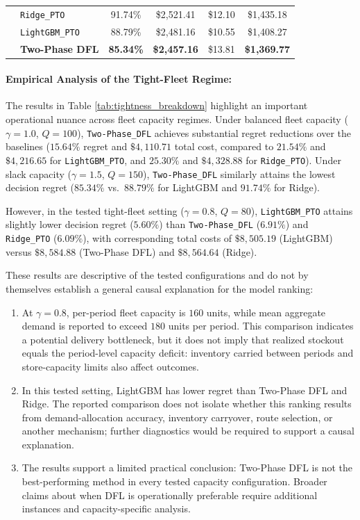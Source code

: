 \documentclass[11pt,a4paper]{article}
\theoremstyle{definition}
\theoremstyle{remark}
\begin{document}
\begin{table}[H]
\begin{tabular}{@{}llcccc@{}}
\midrule
{} 
 & \texttt{Ridge\_PTO} & 91.74\% & \$2,521.41 & \$12.10 & \$1,435.18 \\
 & \texttt{LightGBM\_PTO} & 88.79\% & \$2,481.16 & \$10.55 & \$1,408.27 \\
 & \textbf{Two-Phase DFL} & \textbf{85.34\%} & \textbf{\$2,457.16} & \$13.81 & \textbf{\$1,369.77} \\
\bottomrule
\end{tabular}
\end{table}

\paragraph{Empirical Analysis of the Tight-Fleet Regime:}
The results in Table \ref{tab:tightness_breakdown} highlight an important operational nuance across fleet capacity regimes. Under balanced fleet capacity ($\gamma = 1.0$, $Q = 100$), \texttt{Two-Phase\_DFL} achieves substantial regret reductions over the baselines ($15.64\%$ regret and $\$4,110.71$ total cost, compared to $21.54\%$ and $\$4,216.65$ for \texttt{LightGBM\_PTO}, and $25.30\%$ and $\$4,328.88$ for \texttt{Ridge\_PTO}). Under slack capacity ($\gamma = 1.5$, $Q = 150$), \texttt{Two-Phase\_DFL} similarly attains the lowest decision regret ($85.34\%$ vs.\ $88.79\%$ for LightGBM and $91.74\%$ for Ridge). 

However, in the tested tight-fleet setting ($\gamma = 0.8$, $Q = 80$), \texttt{LightGBM\_PTO} attains slightly lower decision regret ($5.60\%$) than \texttt{Two-Phase\_DFL} ($6.91\%$) and \texttt{Ridge\_PTO} ($6.09\%$), with corresponding total costs of $\$8,505.19$ (LightGBM) versus $\$8,584.88$ (Two-Phase DFL) and $\$8,564.64$ (Ridge). 

These results are descriptive of the tested configurations and do not by themselves establish a general causal explanation for the model ranking:
\begin{enumerate}[label=(\roman*)]
    \item At $\gamma = 0.8$, per-period fleet capacity is $160$ units, while mean aggregate demand is reported to exceed $180$ units per period. This comparison indicates a potential delivery bottleneck, but it does not imply that realized stockout equals the period-level capacity deficit: inventory carried between periods and store-capacity limits also affect outcomes.
    \item In this tested setting, LightGBM has lower regret than Two-Phase DFL and Ridge. The reported comparison does not isolate whether this ranking results from demand-allocation accuracy, inventory carryover, route selection, or another mechanism; further diagnostics would be required to support a causal explanation.
    \item The results support a limited practical conclusion: Two-Phase DFL is not the best-performing method in every tested capacity configuration. Broader claims about when DFL is operationally preferable require additional instances and capacity-specific analysis.
\end{enumerate}
\end{document}
